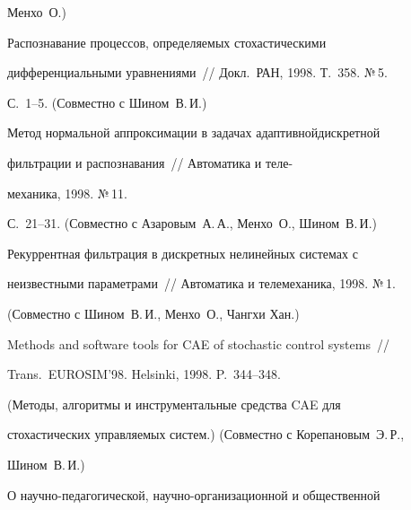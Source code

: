 Менхо~О.)










 Распознавание процессов, определяемых стохастическими\linebreak


дифференциальными уравнениями~// Докл.\ РАН, 1998. Т.~358. №\,5.


 С.~1--5. (Совместно с Шином~В.\,И.)





 Метод нормальной аппроксимации в задачах адаптивной\linebreak дискретной


фильтрации и распознавания~// Автоматика и теле-\linebreak


\vspace*{-12pt}





\pagebreak


\noindent


механика, 1998. №\,11.


С.~21--31. (Совместно с Азаровым~А.\,А., Менхо~О., Шином~В.\,И.)





 Рекуррентная фильтрация в дискретных нелинейных системах с


неизвестными параметрами~// Автоматика и телемеханика, 1998. №\,1.


(Совместно с Шином~В.\,И., Менхо~О., Чангхи Хан.)





Methods and software tools for CAE of stochastic control systems~// 


Trans.\ EUROSIM'98. Helsinki, 1998. P.~344--348.


(Ме\-то\-ды, алгоритмы и инструментальные средства CAE для\linebreak


стохастических управляемых систем.) (Совместно с Корепановым~Э.\,Р.,


Шином~В.\,И.)





 О научно-педагогической, научно-организационной и общественной


